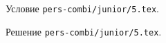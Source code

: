 \problem
Условие \texttt{pers-combi/junior/5.tex}.

\solution Решение \texttt{pers-combi/junior/5.tex}.
\endproblem
